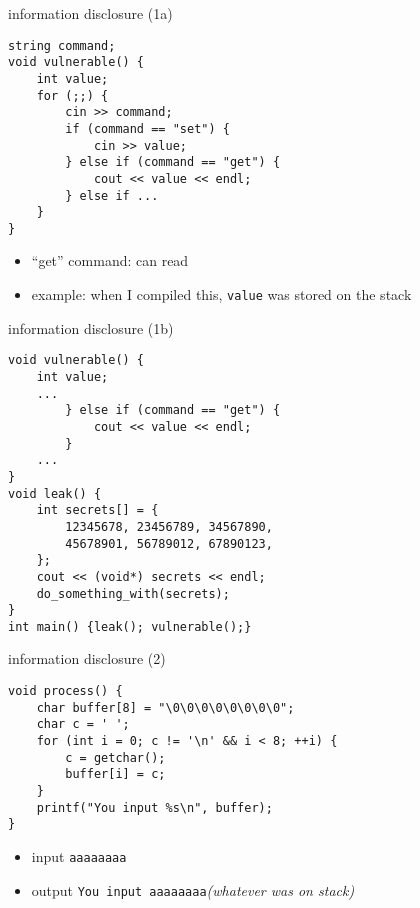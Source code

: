 \begin{frame}[fragile,label=infoDisc1a]{information disclosure (1a)}
\lstset{
    language=C++,
    style=small
}
\begin{lstlisting}
string command;
void vulnerable() {
    int value;
    for (;;) {
        cin >> command;
        if (command == "set") {
            cin >> value;
        } else if (command == "get") {
            cout << value << endl;
        } else if ...
    }
}
\end{lstlisting}
\begin{itemize}
\item ``get'' command: can read 
\item example: when I compiled this, \texttt{value} was stored on the stack
\end{itemize}
\end{frame}

\begin{frame}[fragile,label=infoDisc1b]{information disclosure (1b)}
\lstset{
    language=C++,
    style=smaller
}
\begin{lstlisting}
void vulnerable() {
    int value;
    ...
        } else if (command == "get") {
            cout << value << endl;
        }
    ...
}
void leak() {
    int secrets[] = { 
        12345678, 23456789, 34567890,
        45678901, 56789012, 67890123,
    };  
    cout << (void*) secrets << endl;
    do_something_with(secrets);
}
int main() {leak(); vulnerable();}
\end{lstlisting}
\end{frame}

\begin{frame}[fragile,label=infoDisc2]{information disclosure (2)}
\lstset{
    language=C,
    style=small
}
\begin{lstlisting}
void process() {
    char buffer[8] = "\0\0\0\0\0\0\0\0";
    char c = ' ';
    for (int i = 0; c != '\n' && i < 8; ++i) {
        c = getchar();
        buffer[i] = c;
    }
    printf("You input %s\n", buffer);
}
\end{lstlisting}
\begin{itemize}
\item input \verb|aaaaaaaa|
\item output \verb|You input aaaaaaaa|{\it (whatever was on stack)}
\end{itemize}
\end{frame}

